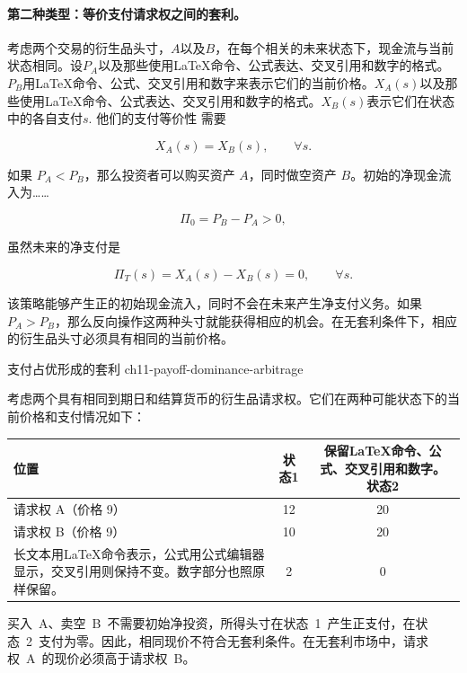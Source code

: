 \paragraph{第二种类型：等价支付请求权之间的套利。}

考虑两个交易的衍生品头寸，$A$以及$B$，在每个相关的未来状态下，现金流与当前状态相同。设$P_A$以及那些使用LaTeX命令、公式表达、交叉引用和数字的格式。$P_B$用LaTeX命令、公式、交叉引用和数字来表示它们的当前价格。$X_A(s)$以及那些使用LaTeX命令、公式表达、交叉引用和数字的格式。$X_B(s)$表示它们在状态中的各自支付$s$. 他们的支付等价性
需要

\begin{equation}
X_A(s)=X_B(s),
\qquad \forall s.
\label{eq:ch11-equivalent-derivative-payoffs}
\end{equation}

如果 $P_A < P_B$，那么投资者可以购买资产 $A$，同时做空资产 $B$。初始的净现金流入为……

\begin{equation}
\Pi_0=P_B-P_A>0,
\end{equation}

虽然未来的净支付是

\begin{equation}
\Pi_T(s)=X_A(s)-X_B(s)=0,
\qquad \forall s.
\end{equation}

该策略能够产生正的初始现金流入，同时不会在未来产生净支付义务。如果$P_A>P_B$，那么反向操作这两种头寸就能获得相应的机会。在无套利条件下，相应的衍生品头寸必须具有相同的当前价格。

\begin{example}{支付占优形成的套利}
{ch11-payoff-dominance-arbitrage}

考虑两个具有相同到期日和结算货币的衍生品请求权。它们在两种可能状态下的当前价格和支付情况如下：

\begin{center}
\begin{tabular}{lcc}
\toprule
\textbf{位置}
& \textbf{状态1}
& \textbf{保留LaTeX命令、公式、交叉引用和数字。  
状态2} \\
\midrule
请求权 A（价格 9） & 12 & 20 \\
请求权 B（价格 9） & 10 & 20 \\
\midrule
长文本用LaTeX命令表示，公式用公式编辑器显示，交叉引用则保持不变。数字部分也照原样保留。 & 2 & 0 \\
\bottomrule
\end{tabular}
\end{center}

买入~A、卖空~B~不需要初始净投资，所得头寸在状态~1~产生正支付，在状态~2~支付为零。因此，相同现价不符合无套利条件。在无套利市场中，请求权~A~的现价必须高于请求权~B。

\end{example}


